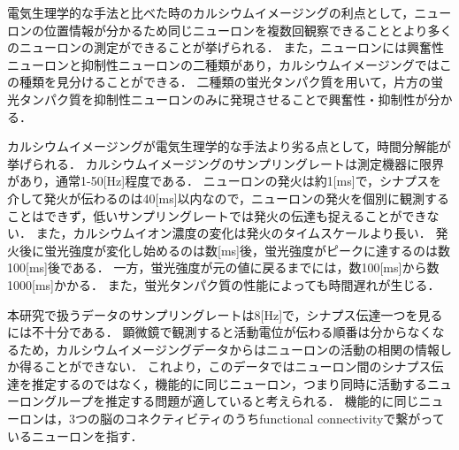 電気生理学的な手法と比べた時のカルシウムイメージングの利点として，ニューロンの位置情報が分かるため同じニューロンを複数回観察できることとより多くのニューロンの測定ができることが挙げられる．
また，ニューロンには興奮性ニューロンと抑制性ニューロンの二種類があり，カルシウムイメージングではこの種類を見分けることができる．
二種類の蛍光タンパク質を用いて，片方の蛍光タンパク質を抑制性ニューロンのみに発現させることで興奮性・抑制性が分かる．

カルシウムイメージングが電気生理学的な手法より劣る点として，時間分解能が挙げられる．
カルシウムイメージングのサンプリングレートは測定機器に限界があり\cite{Nakamura2003}，通常1-50[Hz]程度である．
ニューロンの発火は約1[ms]で，シナプスを介して発火が伝わるのは40[ms]以内\cite{Bi1998}なので，ニューロンの発火を個別に観測することはできず，低いサンプリングレートでは発火の伝達も捉えることができない．
また，カルシウムイオン濃度の変化は発火のタイムスケールより長い．
発火後に蛍光強度が変化し始めるのは数[ms]後，蛍光強度がピークに達するのは数100[ms]後である．
一方，蛍光強度が元の値に戻るまでには，数100[ms]から数1000[ms]かかる\cite{Hira2018}．
また，蛍光タンパク質の性能によっても時間遅れが生じる．

本研究で扱うデータのサンプリングレートは8[Hz]で，シナプス伝達一つを見るには不十分である．
顕微鏡で観測すると活動電位が伝わる順番は分からなくなるため，カルシウムイメージングデータからはニューロンの活動の相関の情報しか得ることができない．
これより，このデータではニューロン間のシナプス伝達を推定するのではなく，機能的に同じニューロン，つまり同時に活動するニューロングループを推定する問題が適していると考えられる．
機能的に同じニューロンは，3つの脳のコネクティビティのうちfunctional connectivityで繋がっているニューロンを指す．
